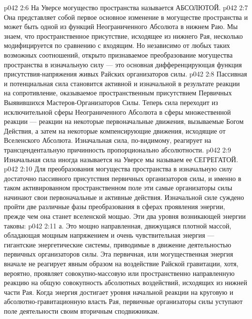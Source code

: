 \vs p042 2:6 На Уверсе могущество пространства называется АБСОЛЮТОЙ.
\vs p042 2:7 \bibnobreakspace {} Она представляет собой первое основное изменение в могуществе пространства и может быть одной из функций Неограниченного Абсолюта в нижнем Раю. Мы знаем, что пространственное присутствие, исходящее из нижнего Рая, несколько модифицируется по сравнению с входящим. Но независимо от любых таких возможных соотношений, открыто признаваемое преобразование могущества пространства в изначальную силу --- это основная дифференцирующая функция присутствия\hyp{}напряжения живых Райских организаторов силы.
\vs p042 2:8 Пассивная и потенциальная сила становится активной и изначальной в результате реакции на сопротивление, оказываемое пространственным присутствием Первичных Выявившихся Мастеров\hyp{}Организаторов Силы. Теперь сила переходит из исключительной сферы Неограниченного Абсолюта в сферы множественной реакции --- реакции на некоторые первоначальные движения, вызываемые Богом Действия, а затем на некоторые компенсирующие движения, исходящие от Вселенского Абсолюта. Изначальная сила, по\hyp{}видимому, реагирует на трансцендентальную причинность пропорционально абсолютности.
\vs p042 2:9 Изначальная сила иногда называется  на Уверсе мы называем ее СЕГРЕГАТОЙ.
\vs p042 2:10 \bibnobreakspace {} Для преобразования могущества пространства в изначальную силу достаточно пассивного присутствия первичных организаторов силы, и именно в таком активированном пространственном поле эти самые организаторы силы начинают свои первоначальные и активные действия. Изначальной силе суждено пройти две различные фазы преобразования в сферах проявления энергии, прежде чем она станет вселенской мощью. Эти два уровня возникающей энергии таковы:
\vs p042 2:11 \pc а.  Это мощно направленная, движущаяся плотной массой, обладающая мощным напряжением и очень чувствительная энергия --- гигантские энергетические системы, приводимые в движение деятельностью первичных организаторов силы. Эта первичная, или могущественная энергия вначале не реагирует явным образом на воздействие Райской гравитации, хотя, вероятно, проявляет совокупно\hyp{}массовую или пространственно направленную реакцию на общую совокупность абсолютных воздействий, исходящих из нижней части Рая. Когда энергия достигает уровня начальной реакции на круговую и абсолютно\hyp{}гравитационную власть Рая, первичные организаторы силы уступают поле деятельности своим вторичным сподвижникам.
